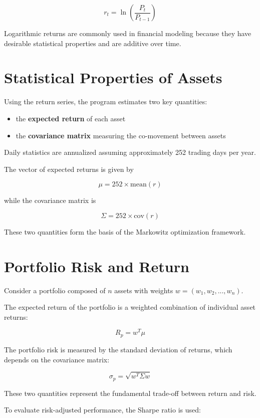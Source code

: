 \documentclass[11pt,a4paper]{article}
\begin{document}
\[
r_t = \ln \left(\frac{P_t}{P_{t-1}}\right)
\]

Logarithmic returns are commonly used in financial modeling because they have desirable statistical properties and are additive over time.

\section{Statistical Properties of Assets}

Using the return series, the program estimates two key quantities:

\begin{itemize}

\item the \textbf{expected return} of each asset

\item the \textbf{covariance matrix} measuring the co-movement between assets

\end{itemize}

Daily statistics are annualized assuming approximately 252 trading days per year.

The vector of expected returns is given by

\[
\mu = 252 \times \text{mean}(r)
\]

while the covariance matrix is

\[
\Sigma = 252 \times \text{cov}(r)
\]

These two quantities form the basis of the Markowitz optimization framework.

\section{Portfolio Risk and Return}

Consider a portfolio composed of \(n\) assets with weights \(w = (w_1, w_2, ..., w_n)\).

The expected return of the portfolio is a weighted combination of individual asset returns:

\[
R_p = w^T \mu
\]

The portfolio risk is measured by the standard deviation of returns, which depends on the covariance matrix:

\[
\sigma_p = \sqrt{w^T \Sigma w}
\]

These two quantities represent the fundamental trade-off between return and risk.

To evaluate risk-adjusted performance, the Sharpe ratio is used:
\end{document}
